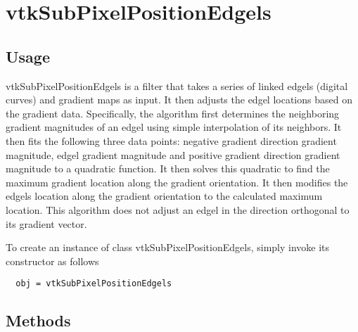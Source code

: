 \section{vtkSubPixelPositionEdgels}

\subsection{Usage}

 vtkSubPixelPositionEdgels is a filter that takes a series of linked
 edgels (digital curves) and gradient maps as input. It then adjusts
 the edgel locations based on the gradient data. Specifically, the
 algorithm first determines the neighboring gradient magnitudes of
 an edgel using simple interpolation of its neighbors. It then fits
 the following three data points: negative gradient direction
 gradient magnitude, edgel gradient magnitude and positive gradient
 direction gradient magnitude to a quadratic function. It then
 solves this quadratic to find the maximum gradient location along
 the gradient orientation.  It then modifies the edgels location
 along the gradient orientation to the calculated maximum
 location. This algorithm does not adjust an edgel in the direction
 orthogonal to its gradient vector.

To create an instance of class vtkSubPixelPositionEdgels, simply
invoke its constructor as follows
\begin{verbatim}
  obj = vtkSubPixelPositionEdgels
\end{verbatim}
\subsection{Methods}


